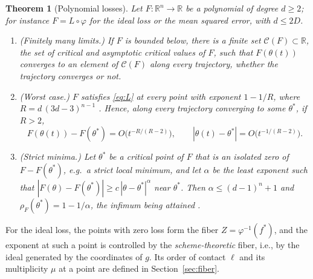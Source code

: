 \documentclass[11pt]{article}
\newtheorem{maintheorem}{Theorem}
\theoremstyle{definition}
\theoremstyle{remark}
\newcommand{\R}{\mathbb{R}}
\newcommand{\cC}{\mathcal{C}}
\begin{document}
\begin{maintheorem}[Polynomial losses]\label{thm:poly}
Let $F\colon\R^n\to\R$ be a polynomial of degree $d\ge2$; for instance $F=L\circ\varphi$ for the ideal loss or the mean squared error, with $d\le2D$.
\begin{enumerate}[label=\textup{(\roman*)},leftmargin=2.6em]
\item\label{A1} \emph{(Finitely many limits.)} If $F$ is bounded below, there is a finite set $\cC(F)\subset\R$, the set of critical and asymptotic critical values of $F$, such that $F(\theta(t))$ converges to an element of $\cC(F)$ along every trajectory, whether the trajectory converges or not.
\item\label{A2} \emph{(Worst case.)} $F$ satisfies \eqref{eq:L} at every point with exponent $1-1/R$, where $R=d\,(3d-3)^{n-1}$ \cite{DK05}. Hence, along every trajectory converging to some $\theta^*$, if $R>2$,
\[
F(\theta(t))-F(\theta^*)=O\big(t^{-R/(R-2)}\big),\qquad|\theta(t)-\theta^*|=O\big(t^{-1/(R-2)}\big).
\]
\item\label{A3} \emph{(Strict minima.)} Let $\theta^*$ be a critical point of $F$ that is an isolated zero of $F-F(\theta^*)$, e.g.\ a strict local minimum, and let $\alpha$ be the least exponent such that $|F(\theta)-F(\theta^*)|\ge c\,|\theta-\theta^*|^{\alpha}$ near $\theta^*$. Then $\alpha\le(d-1)^n+1$ and $\rho_F(\theta^*)=1-1/\alpha$, the infimum being attained \cite{Gwo99}.
\end{enumerate}
\end{maintheorem}

For the ideal loss, the points with zero loss form the fiber $Z=\varphi^{-1}(f^*)$, and the exponent at such a point is controlled by the \emph{scheme-theoretic} fiber, i.e., by the ideal generated by the coordinates of $g$. Its order of contact $\ell$ and its multiplicity $\mu$ at a point are defined in Section~\ref{sec:fiber}.
\end{document}
